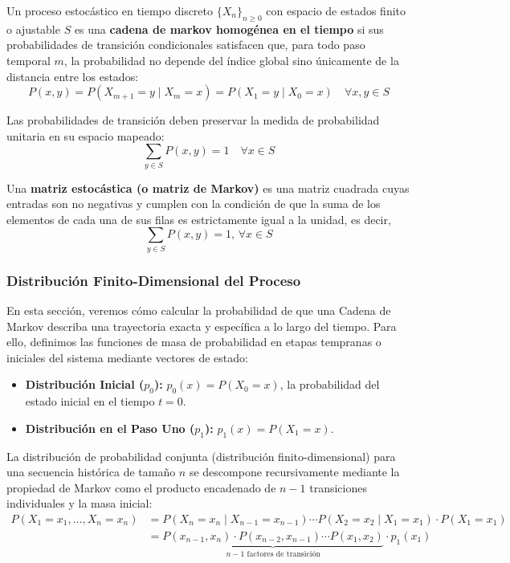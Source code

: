 \begin{definicion}
    Un proceso estocástico en tiempo discreto $\{X_n\}_{n \ge 0}$ con espacio de estados finito o ajustable $S$ es una \textbf{cadena de markov homogénea en el tiempo} si sus probabilidades de transición condicionales satisfacen que, para todo paso temporal $m$, la probabilidad no depende del índice global sino únicamente de la distancia entre los estados:
    \begin{equation*}
        P(x, y) = P(X_{m+1} = y \mid X_m = x) = P(X_1 = y \mid X_0 = x) \quad \forall x, y \in S
    \end{equation*}
\end{definicion}



\noindent Las probabilidades de transición deben preservar la medida de probabilidad unitaria en su espacio mapeado:
\begin{equation*}
    \sum_{y \in S} P(x, y) = 1 \quad \forall x \in S
\end{equation*}

\begin{definicion}
    Una \textbf{matriz estocástica (o matriz de Markov)} es una matriz cuadrada cuyas entradas son no negativas y cumplen con la condición de que la suma de los elementos de cada una de sus filas es estrictamente igual a la unidad, es decir,
    $$\sum_{y \in S} P(x, y) = 1, \, \forall x \in S$$
\end{definicion}

\subsubsection{Distribución Finito-Dimensional del Proceso}
\noindent
En esta sección, veremos cómo calcular la probabilidad de que una Cadena de Markov describa una trayectoria exacta y específica a lo largo del tiempo. Para ello, definimos las funciones de masa de probabilidad en etapas tempranas o iniciales del sistema mediante vectores de estado:
\begin{itemize}
    \item \textbf{Distribución Inicial ($p_0$):} $p_0(x) = P(X_0 = x)$, la probabilidad del estado inicial en el tiempo $t=0$.
    \item \textbf{Distribución en el Paso Uno ($p_1$):} $p_1(x) = P(X_1 = x)$.
\end{itemize}

\noindent 
La distribución de probabilidad conjunta (distribución finito-dimensional) para una secuencia histórica de tamaño $n$ se descompone recursivamente mediante la propiedad de Markov como el producto encadenado de $n-1$ transiciones individuales y la masa inicial:
\begin{align*}
    P(X_1 = x_1, \dots, X_n = x_n) &= P(X_n = x_n \mid X_{n-1} = x_{n-1}) \cdots P(X_2 = x_2 \mid X_1 = x_1) \cdot P(X_1 = x_1) \nonumber \\
    &= \underbrace{P(x_{n-1}, x_n) \cdot P(x_{n-2}, x_{n-1}) \cdots P(x_1, x_2)}_{n-1 \text{ factores de transición}} \cdot p_1(x_1)
\end{align*}

